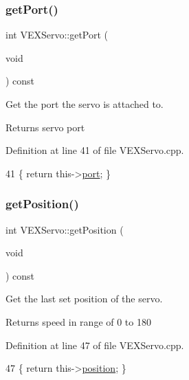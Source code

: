 \subsubsection{\texorpdfstring{get\+Port()}{getPort()}}
{\footnotesize\ttfamily int V\+E\+X\+Servo\+::get\+Port (\begin{DoxyParamCaption}\item[{void}]{ }\end{DoxyParamCaption}) const}



Get the port the servo is attached to. 

\begin{DoxyReturn}{Returns}
servo port 
\end{DoxyReturn}


Definition at line 41 of file V\+E\+X\+Servo.\+cpp.


\begin{DoxyCode}
41 \{ \textcolor{keywordflow}{return} this->\hyperlink{class_v_e_x_servo_a34333ff9091be5124f25597c95593291}{port}; \}
\end{DoxyCode}
\mbox{\label{class_v_e_x_servo_ab8e68afd09a6c67cf71182543f24eb21}} 
\subsubsection{\texorpdfstring{get\+Position()}{getPosition()}}
{\footnotesize\ttfamily int V\+E\+X\+Servo\+::get\+Position (\begin{DoxyParamCaption}\item[{void}]{ }\end{DoxyParamCaption}) const}



Get the last set position of the servo. 

\begin{DoxyReturn}{Returns}
speed in range of 0 to 180 
\end{DoxyReturn}


Definition at line 47 of file V\+E\+X\+Servo.\+cpp.


\begin{DoxyCode}
47 \{ \textcolor{keywordflow}{return} this->\hyperlink{class_v_e_x_servo_aa277013ab5c085b050b9a28f61e11e8b}{position}; \}
\end{DoxyCode}
\mbox{\label{class_v_e_x_servo_a9bd31afec53e4c45d264c2480b0c0e5e}} 
